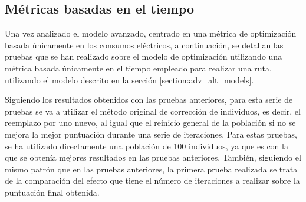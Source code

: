 \documentclass[11pt,spanish,listoffigures,listoftables]{tfgetsinf}
\begin{document}
\newpage
\subsection{Métricas basadas en el tiempo}
Una vez analizado el modelo avanzado, centrado en una métrica de optimización basada únicamente en los consumos eléctricos, a continuación, se detallan las pruebas que se han realizado sobre el modelo de optimización utilizando una métrica basada únicamente en el tiempo empleado para realizar una ruta, utilizando el modelo descrito en la sección \ref{section:adv_alt_models}.

Siguiendo los resultados obtenidos con las pruebas anteriores, para esta serie de pruebas se va a utilizar el método original de corrección de individuos, es decir, el reemplazo por uno nuevo, al igual que el reinicio general de la población si no se mejora la mejor puntuación durante una serie de iteraciones. Para estas pruebas, se ha utilizado directamente una población de 100 individuos, ya que es con la que se obtenía mejores resultados en las pruebas anteriores. También, siguiendo el mismo patrón que en las pruebas anteriores, la primera prueba realizada se trata de la comparación del efecto que tiene el número de iteraciones a realizar sobre la puntuación final obtenida.
\end{document}
